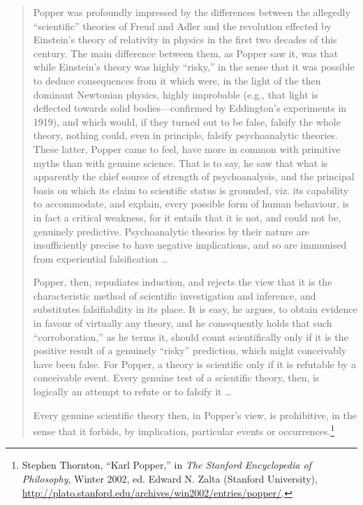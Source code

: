 \begin{quotation}
{
 Popper was profoundly impressed by the differences between the
allegedly ``scientific'' theories of
Freud and Adler and the revolution effected by
Einstein's theory of relativity in physics in the first
two decades of this century. The main difference between them, as
Popper saw it, was that while Einstein's theory was
highly ``risky,'' in the sense that
it was possible to deduce consequences from it which were, in the light
of the then dominant Newtonian physics, highly improbable (e.g., that
light is deflected towards solid bodies---confirmed by
Eddington's experiments in 1919), and which would, if
they turned out to be false, falsify the whole theory, nothing could,
even in principle, falsify psychoanalytic theories. These latter,
Popper came to feel, have more in common with primitive myths than with
genuine science. That is to say, he saw that what is apparently the
chief source of strength of psychoanalysis, and the principal basis on
which its claim to scientific status is grounded, viz. its capability
to accommodate, and explain, every possible form of human behaviour, is
in fact a critical weakness, for it entails that it is not, and could
not be, genuinely predictive. Psychoanalytic theories by their nature
are insufficiently precise to have negative implications, and so are
immunised from experiential falsification \ldots}

{
 Popper, then, repudiates induction, and rejects the view that it
is the characteristic method of scientific investigation and inference,
and substitutes falsifiability in its place. It is easy, he argues, to
obtain evidence in favour of virtually any theory, and he consequently
holds that such ``corroboration,''
as he terms it, should count scientifically only if it is the positive
result of a genuinely ``risky''
prediction, which might conceivably have been false. For Popper, a
theory is scientific only if it is refutable by a conceivable event.
Every genuine test of a scientific theory, then, is logically an
attempt to refute or to falsify it \ldots}

{
 Every genuine scientific theory then, in Popper's
view, is prohibitive, in the sense that it forbids, by implication,
particular events or occurrences.\footnote{Stephen Thornton, ``Karl
Popper,'' in \textit{The Stanford Encyclopedia of
Philosophy}, Winter 2002, ed. Edward N. Zalta (Stanford University),
\url{http://plato.stanford.edu/archives/win2002/entries/popper/}.}}
\end{quotation}

